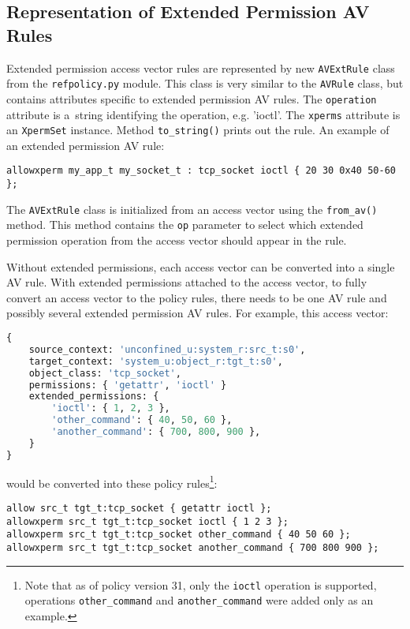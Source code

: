 \subsection{Representation of Extended Permission AV Rules}
Extended permission access vector rules are represented by new
\texttt{AVExtRule} class from the \texttt{refpolicy.py} module. This class is
very similar to the \texttt{AVRule} class, but contains attributes specific to
extended permission AV rules. The \texttt{operation} attribute is a~string
identifying the operation, e.g. 'ioctl'. The \texttt{xperms} attribute is an
\texttt{XpermSet} instance. Method \texttt{to\_string()} prints out the rule.
An example of an extended permission AV rule:
\begin{lstlisting}
allowxperm my_app_t my_socket_t : tcp_socket ioctl { 20 30 0x40 50-60 };
\end{lstlisting}

The \texttt{AVExtRule} class is initialized from an access vector using the
\texttt{from\_av()} method. This method contains the \texttt{op} parameter to
select which extended permission operation from the access vector should appear
in the rule.

Without extended permissions, each access vector can be converted into a single
AV rule. With extended permissions attached to the access vector, to fully
convert an access vector to the policy rules, there needs to be one AV rule and
possibly several extended permission AV rules. For example, this access vector:

\pagebreak

\begin{lstlisting}[language=Python]
{
    source_context: 'unconfined_u:system_r:src_t:s0',
    target_context: 'system_u:object_r:tgt_t:s0',
    object_class: 'tcp_socket',
    permissions: { 'getattr', 'ioctl' }
    extended_permissions: {
        'ioctl': { 1, 2, 3 },
        'other_command': { 40, 50, 60 },
        'another_command': { 700, 800, 900 },
    }
}
\end{lstlisting}
would be converted into these policy rules\footnote{Note that as of policy
version 31, only the \texttt{ioctl} operation is supported, operations
\texttt{other\_command} and \texttt{another\_command} were added only as an
example.}:
\begin{lstlisting}
allow src_t tgt_t:tcp_socket { getattr ioctl };
allowxperm src_t tgt_t:tcp_socket ioctl { 1 2 3 };
allowxperm src_t tgt_t:tcp_socket other_command { 40 50 60 };
allowxperm src_t tgt_t:tcp_socket another_command { 700 800 900 };
\end{lstlisting}

